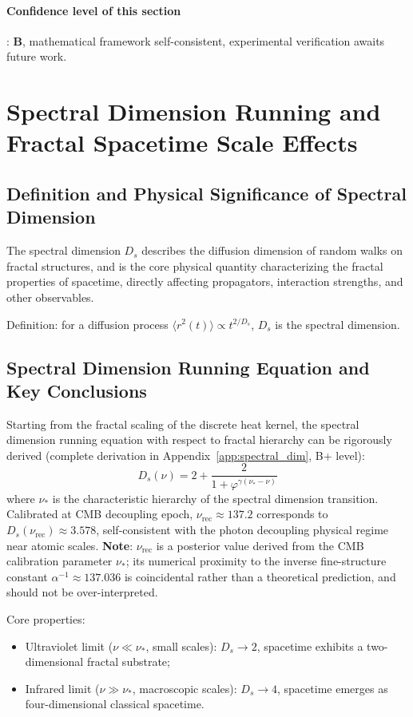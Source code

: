 \documentclass[12pt,a4paper,twocolumn]{article}
\renewcommand{\phi}{\varphi}
\begin{document}
\paragraph{Confidence level of this section}: \textbf{B}, mathematical framework self-consistent, experimental verification awaits future work.

\section{Spectral Dimension Running and Fractal Spacetime Scale Effects}
\label{sec:spectral_dimension}

\subsection{Definition and Physical Significance of Spectral Dimension}
The spectral dimension $D_s$ describes the diffusion dimension of random walks on fractal structures, and is the core physical quantity characterizing the fractal properties of spacetime, directly affecting propagators, interaction strengths, and other observables.

Definition: for a diffusion process $\langle r^2(t) \rangle \propto t^{2/D_s}$, $D_s$ is the spectral dimension.

\subsection{Spectral Dimension Running Equation and Key Conclusions}
\label{subsec:spectral_running}
Starting from the fractal scaling of the discrete heat kernel, the spectral dimension running equation with respect to fractal hierarchy can be rigorously derived (complete derivation in Appendix~\ref{app:spectral_dim}, B+ level):
\[
D_s(\nu) = 2 + \frac{2}{1 + \phi^{\gamma(\nu_* - \nu)}}
\]
where $\nu_*$ is the characteristic hierarchy of the spectral dimension transition. Calibrated at CMB decoupling epoch, $\nu_{\text{rec}}\approx137.2$ corresponds to $D_s(\nu_{\text{rec}})\approx3.578$, self-consistent with the photon decoupling physical regime near atomic scales. \textbf{Note}: $\nu_{\text{rec}}$ is a posterior value derived from the CMB calibration parameter $\nu_*$; its numerical proximity to the inverse fine-structure constant $\alpha^{-1}\approx137.036$ is coincidental rather than a theoretical prediction, and should not be over-interpreted.

Core properties:
\begin{itemize}
\item Ultraviolet limit ($\nu \ll \nu_*$, small scales): $D_s \to 2$, spacetime exhibits a two-dimensional fractal substrate;
\item Infrared limit ($\nu \gg \nu_*$, macroscopic scales): $D_s \to 4$, spacetime emerges as four-dimensional classical spacetime.
\end{itemize}
\end{document}
